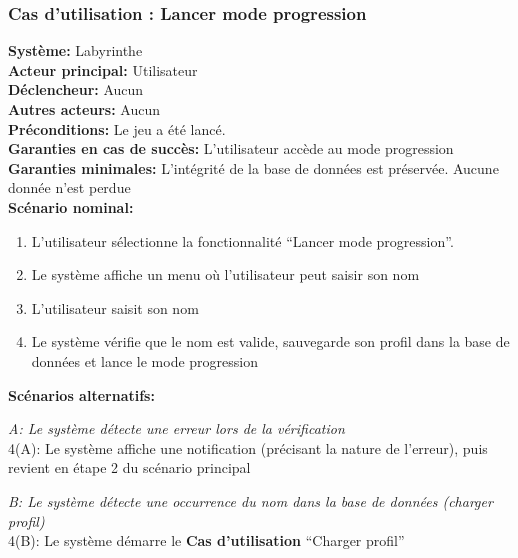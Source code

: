 \documentclass{butexFR}
\begin{document}
\subsubsection{Cas d'utilisation : Lancer mode progression}
\textbf{Système:} Labyrinthe\\
\textbf{Acteur principal:} Utilisateur\\
\textbf{Déclencheur:} Aucun\\
\textbf{Autres acteurs:} Aucun\\[0.25em]
\textbf{Préconditions:} Le jeu a été lancé.\\
\textbf{Garanties en cas de succès:} L'utilisateur accède au mode progression\\
\textbf{Garanties minimales:} L'intégrité de la base de données est préservée. Aucune donnée n'est perdue\\[0.25em]
\textbf{Scénario nominal:}
\begin{enumerate}
    \item L'utilisateur sélectionne la fonctionnalité ``Lancer mode progression''.
    \item Le système affiche un menu où l'utilisateur peut saisir son nom
    \item L'utilisateur saisit son nom
    \item Le système vérifie que le nom est valide, sauvegarde son profil dans la base de données et lance le mode progression
\end{enumerate}
\textbf{Scénarios alternatifs:}

\emph{A: Le système détecte une erreur lors de la vérification}\\
\hspace*{1em}4(A): Le système affiche une notification (précisant la nature de l'erreur), puis revient en étape 2 du scénario principal

\emph{B: Le système détecte une occurrence du nom dans la base de données (charger profil)}\\
\hspace*{1em}4(B): Le système démarre le \textbf{Cas d'utilisation} ``Charger profil''

\newpage
\end{document}
